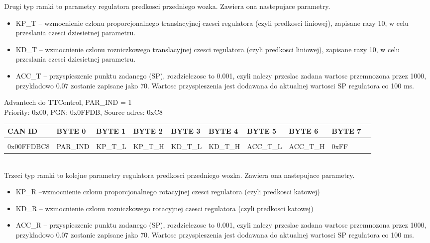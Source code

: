 \documentclass{article}
\begin{document}
Drugi typ ramki to parametry regulatora predkosci przedniego wozka. Zawiera ona nastepujace parametry. 
\begin{itemize}
    \item KP\_T -- wzmocnienie czlonu proporcjonalnego translacyjnej czesci regulatora (czyli predkosci liniowej), zapisane razy 10, w celu przeslania czesci dziesietnej parametru.
    \item KD\_T -- wzmocnienie czlonu rozniczkowego translacyjnej czesci regulatora (czyli predkosci liniowej), zapisane razy 10, w celu przeslania czesci dziesietnej parametru.
    \item ACC\_T -- przyspieszenie punktu zadanego (SP), rozdzielczosc to 0.001, czyli nalezy przeslac zadana wartosc przemnozona przez 1000, przykladowo 0.07 zostanie zapisane jako 70. Wartosc przyspieszenia jest dodawana do aktualnej wartosci SP regulatora co 100 ms.
\end{itemize}

Advantech do TTControl, PAR\_IND  = 1\\
Priority: 0x00, PGN: 0x0FFDB, Source adres: 0xC8 \\
\begin{left}
\begin{tabular}{ |p{2cm}|p{1.35cm}|p{1.2cm}|p{1.50cm}|p{1.50cm}|p{1.35cm}|p{1.4cm}|p{1.4cm}|p{1.35cm}|p{1.35cm}|} 
 \hline
 CAN ID & BYTE 0 & BYTE 1 & BYTE 2 & BYTE 3 & BYTE 4 & BYTE 5 & BYTE 6 & BYTE 7 \\ \hline
 & & & & & & & &\\
0x00FFDBC8 & PAR\_IND & KP\_T\_L & KP\_T\_H & KD\_T\_L & KD\_T\_H & ACC\_T\_L & ACC\_T\_H & 0xFF \\
 \hline
\end{tabular}
\end{left}\\

Trzeci typ ramki to kolejne parametry regulatora predkosci przedniego wozka. Zawiera ona nastepujace parametry. 
\begin{itemize}
    \item KP\_R --wzmocnienie czlonu proporcjonalnego rotacyjnej czesci regulatora (czyli predkosci katowej)
    \item KD\_R -- wzmocnienie czlonu rozniczkowego rotacyjnej czesci regulatora (czyli predkosci katowej)
    \item ACC\_R -- przyspieszenie punktu zadanego (SP), rozdzielczosc to 0.001, czyli nalezy przeslac zadana wartosc przemnozona przez 1000, przykladowo 0.07 zostanie zapisane jako 70. Wartosc przyspieszenia jest dodawana do aktualnej wartosci SP regulatora co 100 ms.
\end{itemize}
\end{document}

